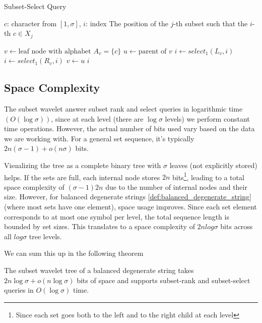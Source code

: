\begin{algorithm}[h]
    \caption{Subset-Select Query}
    \label{alg:subset-access}
    \begin{algorithmic}[1]
        \Require $c$: character from $[1, \sigma]$, $i$: index
        \Ensure The position of the $j$-th subset such that the $i$-th $c \in X_j$
    \end{algorithmic}
    \begin{algorithmic}
        \State $v \gets \text{leaf node with alphabet } A_v = \{c\}$
         
        \State $u \gets \text{parent of } v$
        \State $i \gets select_1(L_v, i)$
        \Else
        \State $i \gets select_1(R_v, i)$
        \EndIf
        \State $v \gets u$
        \EndWhile
        \State \Return $i$
        \EndFunction
    \end{algorithmic}
\end{algorithm}

\subsection*{Space Complexity}
The subset wavelet answer subset rank and select queries in logarithmic time $(O(\log \sigma))$, since at each level (there are $\log \sigma$ levels) we perform constant time operations. However, the actual number of bits used vary based on the data we are working with. For a general set sequence, it's typically $2n(\sigma - 1) + o(n\sigma)$ bits. \vspace{0.4cm}

\noindent Visualizing the tree as a complete binary tree with $\sigma$ leaves (not explicitly stored) helps. If the sets are full, each internal node stores $2n$ bits\footnote{Since each set goes both to the left and to the right child at each level}, leading to a total space complexity of $(\sigma - 1)2n$ due to the number of internal nodes and their size. However, for balanced degenerate strings \ref{def:balanced_degenerate_string} (where most sets have one element), space usage improves. Since each set element corresponds to at most one symbol per level, the total sequence length is bounded by set sizes. This translates to a space complexity of $2n log \sigma$ bits across all $log \sigma$ tree levels. \vspace{0.4cm}

\noindent We can sum this up in the following theorem

\begin{theorem}
    The subset wavelet tree of a balanced degenerate string takes $2n \log \sigma + o(n \log \sigma)$ bits of space and supports subset-rank and subset-select queries in $O(\log \sigma)$ time.
\end{theorem}

